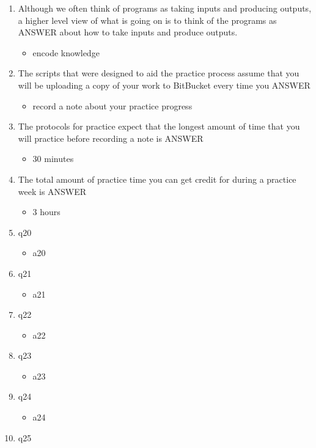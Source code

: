\documentclass{exam}
\begin{document}
\begin{enumerate}
\item Although we often think of programs as taking inputs and producing outputs, a higher level view of what is going on is to think of the programs as ANSWER about how to take inputs and produce outputs.
\begin{itemize}
\item encode knowledge
\end{itemize}
\item The scripts that were designed to aid the practice process assume that you will be uploading a copy of your work to BitBucket every time you ANSWER
\begin{itemize}
\item record a note about your practice progress
\end{itemize}
\item The protocols for practice expect that the longest amount of time that you will practice before recording a note is ANSWER
\begin{itemize}
\item 30 minutes
\end{itemize}
\item The total amount of practice time you can get credit for during a practice week is ANSWER
\begin{itemize}
\item 3 hours
\end{itemize}
\item q20
\begin{itemize}
\item a20
\end{itemize}
\item q21
\begin{itemize}
\item a21
\end{itemize}
\item q22
\begin{itemize}
\item a22
\end{itemize}
\item q23
\begin{itemize}
\item a23
\end{itemize}
\item q24
\begin{itemize}
\item a24
\end{itemize}
\item q25
\begin{itemize}

\end{itemize}
\end{enumerate}
\end{document}
